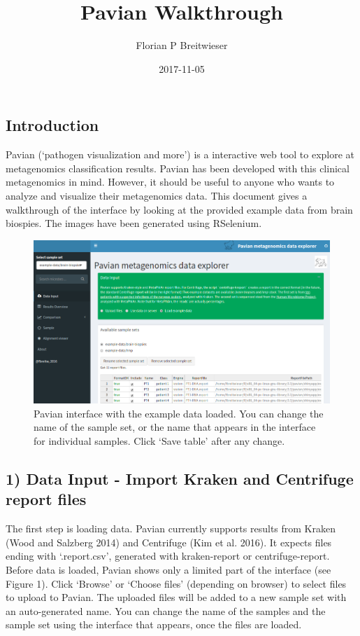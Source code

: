 \documentclass[]{article}
\title{Pavian Walkthrough}
\author{Florian P Breitwieser}
\date{2017-11-05}
\begin{document}
\maketitle

{
\setcounter{tocdepth}{2}
\tableofcontents
}
\subsection{Introduction}\label{introduction}

Pavian (`pathogen visualization and more') is a interactive web tool to
explore at metagenomics classification results. Pavian has been
developed with this clinical metagenomics in mind. However, it should be
useful to anyone who wants to analyze and visualize their metagenomics
data. This document gives a walkthrough of the interface by looking at
the provided example data from brain biospies. The images have been
generated using RSelenium.

\begin{figure}[htbp]
\centering
\includegraphics{load-data-set.png}
\caption{Pavian interface with the example data loaded. You can change
the name of the sample set, or the name that appears in the interface
for individual samples. Click `Save table' after any change.}
\end{figure}

\subsection{1) Data Input - Import Kraken and Centrifuge report
files}\label{data-input---import-kraken-and-centrifuge-report-files}

The first step is loading data. Pavian currently supports results from
Kraken (Wood and Salzberg 2014) and Centrifuge (Kim et al. 2016). It
expects files ending with `.report.csv', generated with kraken-report or
centrifuge-report. Before data is loaded, Pavian shows only a limited
part of the interface (see Figure 1). Click `Browse' or `Choose files'
(depending on browser) to select files to upload to Pavian. The uploaded
files will be added to a new sample set with an auto-generated name. You
can change the name of the samples and the sample set using the
interface that appears, once the files are loaded.
\end{document}
